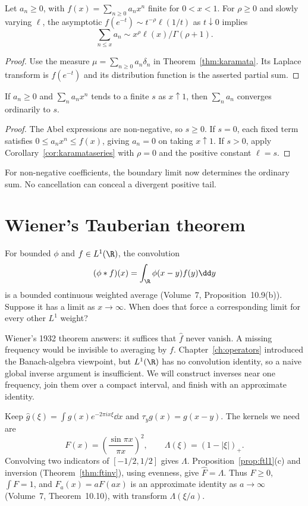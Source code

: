 \begin{corollary}\label{cor:karamataseries}
Let $a_n\ge0$, with $f(x)=\sum_{n\ge0}a_nx^n$ finite for $0<x<1$. For $\rho\ge0$ and slowly varying $\ell$, the asymptotic $f(e^{-t})\sim t^{-\rho}\ell(1/t)$ as $t\downarrow0$ implies
\[\sum_{n\le x}a_n\sim x^\rho\ell(x)/\Gamma(\rho+1).\]
\end{corollary}
\begin{proof}
Use the measure $\mu=\sum_{n\ge0}a_n\delta_n$ in Theorem~\ref{thm:karamata}. Its Laplace transform is $f(e^{-t})$ and its distribution function is the asserted partial sum.
\end{proof}

\begin{corollary}\label{cor:abelconverse}
If $a_n\ge0$ and $\sum_na_nx^n$ tends to a finite $s$ as $x\uparrow1$, then $\sum_na_n$ converges ordinarily to $s$.
\end{corollary}
\begin{proof}
The Abel expressions are non-negative, so $s\ge0$. If $s=0$, each fixed term satisfies $0\le a_nx^n\le f(x)$, giving $a_n=0$ on taking $x\uparrow1$. If $s>0$, apply Corollary~\ref{cor:karamataseries} with $\rho=0$ and the positive constant $\ell=s$.
\end{proof}

For non-negative coefficients, the boundary limit now determines the ordinary sum. No cancellation can conceal a divergent positive tail.

\section{Wiener's Tauberian theorem}

For bounded $\phi$ and $f\in L^1(\R)$, the convolution
\[(\phi*f)(x)=\int_\R\phi(x-y)f(y)\dd y\]
is a bounded continuous weighted average (Volume~7, Proposition~10.9(b)). Suppose it has a limit as $x\to\infty$. When does that force a corresponding limit for every other $L^1$ weight?

Wiener's 1932 theorem answers: it suffices that $\hat f$ never vanish. A missing frequency would be invisible to averaging by $f$. Chapter~\ref{ch:operators} introduced the Banach-algebra viewpoint, but $L^1(\R)$ has no convolution identity, so a naive global inverse argument is insufficient. We will construct inverses near one frequency, join them over a compact interval, and finish with an approximate identity.

Keep $\hat g(\xi)=\int g(x)e^{-2\pi ix\xi}\dd x$ and $\tau_yg(x)=g(x-y)$. The kernels we need are
\[F(x)=\left(\frac{\sin\pi x}{\pi x}\right)^2,\qquad\Lambda(\xi)=(1-|\xi|)_+.
\]
Convolving two indicators of $[-1/2,1/2]$ gives $\Lambda$. Proposition~\ref{prop:ftl1}(c) and inversion (Theorem~\ref{thm:ftinv}), using evenness, give $\hat F=\Lambda$. Thus $F\ge0$, $\int F=1$, and $F_a(x)=aF(ax)$ is an approximate identity as $a\to\infty$ (Volume~7, Theorem~10.10), with transform $\Lambda(\xi/a)$.

